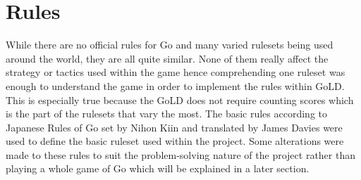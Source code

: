 \documentclass{l4proj}
\begin{document}
\section{Rules}

While there are no official rules for Go and many varied rulesets being used around the world, they are all quite similar. None of them really affect the strategy or tactics used within the game hence comprehending one ruleset was enough to understand the game in order to implement the rules within GoLD. This is especially true because the GoLD does not require counting scores which is the part of the rulesets that vary the most. The basic rules according to Japanese Rules of Go set by Nihon Kiin and translated by James Davies \cite{NihonKiinRules} were used to define the basic ruleset used within the project. Some alterations were made to these rules to suit the problem-solving nature of the project rather than playing a whole game of Go which will be explained in a later section.
\end{document}
